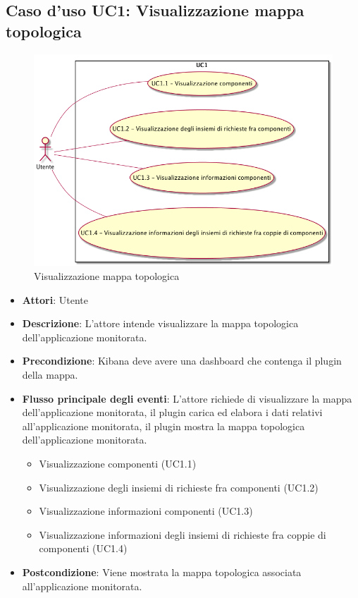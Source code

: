 \subsection{Caso d'uso UC1: Visualizzazione mappa topologica}
\begin{figure} [H]
\centering
\includegraphics[scale=0.45]{./UC/UC1.png}
\caption{Visualizzazione mappa topologica}\label{}
\end{figure}
\begin{itemize}
\item \textbf{Attori}: Utente
\item \textbf{Descrizione}: L'attore intende visualizzare la mappa topologica dell'applicazione monitorata.
\item \textbf{Precondizione}: Kibana deve avere una dashboard che contenga il plugin della mappa.
\item \textbf{Flusso principale degli eventi}: L'attore richiede di visualizzare la mappa dell'applicazione monitorata, il plugin carica ed elabora i dati relativi all'applicazione monitorata, il plugin mostra la mappa topologica dell'applicazione monitorata.
\begin{itemize}
\item Visualizzazione componenti (UC1.1)
\item Visualizzazione degli insiemi di richieste fra componenti (UC1.2)
\item Visualizzazione informazioni componenti (UC1.3)
\item Visualizzazione informazioni degli insiemi di richieste fra coppie di componenti (UC1.4)
\end{itemize}
\item \textbf{Postcondizione}: Viene mostrata la mappa topologica associata all'applicazione monitorata.
\end{itemize}
